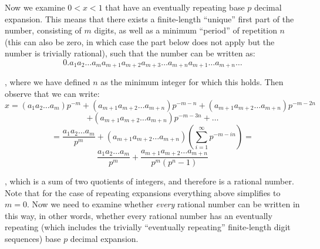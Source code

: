 \begin{solution}
    Now we examine $0 < x < 1$ that have an eventually repeating base $p$ decimal expansion. This means that there exists a finite-length ``unique'' first part of the number, consisting of $m$ digits, as well as a minimum ``period'' of repetition $n$ (this can also be zero, in which case the part below does not apply but the number is trivially rational), such that the number can be written as:
    $$0.a_1 a_2 \ldots a_m a_{m+1} a_{m+2} a_{m+3} \ldots a_{m+n} a_{m+1} \ldots a_{m+n} \ldots$$

    , where we have defined $n$ as the minimum integer for which this holds. Then observe that we can write:
    $$x = (a_1 a_2 \ldots a_m)p^{-m} + (a_{m+1} a_{m+2}\ldots a_{m+n})p^{-m-n} + (a_{m+1} a_{m+2}\ldots a_{m+n})p^{-m-2n}$$
    $$ + (a_{m+1} a_{m+2} \ldots a_{m+n})p^{-m-3n} + \ldots $$
    $$= \frac{a_1 a_2 \ldots a_m}{p^m} + (a_{m+1} a_{m+2} \ldots a_{m+n})(\sum_{i=1}^{\infty} p^{-m-in}) = $$
    $$\frac{a_1 a_2 \ldots a_m}{p^m} + \frac{a_{m+1} a_{m+2} \ldots a_{m+n}}{p^{m}(p^n - 1)}$$

    , which is a sum of two quotients of integers, and therefore is a rational number. Note that for the case of repeating expansions everything above simplifies to $m=0$. Now we need to examine whether \textit{every} rational number can be written in this way, in other words, whether every rational number has an eventually repeating (which includes the trivially ``eventually repeating'' finite-length digit sequences) base $p$ decimal expansion.


\end{solution}
